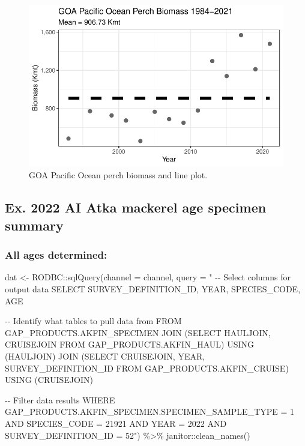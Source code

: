 \documentclass[
  letterpaper,
  oneside,
  open=any]{scrbook}
\newenvironment{Shaded}{\begin{snugshade}}{\end{snugshade}}
\newcommand{\AttributeTok}[1]{\textcolor[rgb]{0.40,0.45,0.13}{#1}}
\newcommand{\FunctionTok}[1]{\textcolor[rgb]{0.28,0.35,0.67}{#1}}
\newcommand{\NormalTok}[1]{\textcolor[rgb]{0.00,0.23,0.31}{#1}}
\newcommand{\OtherTok}[1]{\textcolor[rgb]{0.00,0.23,0.31}{#1}}
\newcommand{\SpecialCharTok}[1]{\textcolor[rgb]{0.37,0.37,0.37}{#1}}
\newcommand{\StringTok}[1]{\textcolor[rgb]{0.13,0.47,0.30}{#1}}
\begin{document}
\begin{figure}[H]

{\centering \includegraphics{content/akfin-oracle-sql-r_files/figure-pdf/test-5-fig-1.pdf}

}

\caption{GOA Pacific Ocean perch biomass and line plot.}

\end{figure}

\hypertarget{ex.-2022-ai-atka-mackerel-age-specimen-summary}{%
\subsection{Ex. 2022 AI Atka mackerel age specimen
summary}\label{ex.-2022-ai-atka-mackerel-age-specimen-summary}}

\hypertarget{all-ages-determined}{%
\subsubsection{All ages determined:}\label{all-ages-determined}}

\begin{Shaded}
\begin{Highlighting}[]
\NormalTok{dat }\OtherTok{\textless{}{-}}\NormalTok{ RODBC}\SpecialCharTok{::}\FunctionTok{sqlQuery}\NormalTok{(}\AttributeTok{channel =}\NormalTok{ channel,}
                       \AttributeTok{query =} \StringTok{"}
\StringTok{{-}{-} Select columns for output data}
\StringTok{SELECT SURVEY\_DEFINITION\_ID, YEAR, SPECIES\_CODE, AGE}

\StringTok{{-}{-} Identify what tables to pull data from}
\StringTok{FROM GAP\_PRODUCTS.AKFIN\_SPECIMEN}
\StringTok{JOIN (SELECT HAULJOIN, CRUISEJOIN FROM GAP\_PRODUCTS.AKFIN\_HAUL)}
\StringTok{USING (HAULJOIN)}
\StringTok{JOIN (SELECT CRUISEJOIN, YEAR, SURVEY\_DEFINITION\_ID FROM GAP\_PRODUCTS.AKFIN\_CRUISE)}
\StringTok{USING (CRUISEJOIN)}

\StringTok{{-}{-} Filter data results}
\StringTok{WHERE GAP\_PRODUCTS.AKFIN\_SPECIMEN.SPECIMEN\_SAMPLE\_TYPE = 1}
\StringTok{AND SPECIES\_CODE = 21921}
\StringTok{AND YEAR = 2022}
\StringTok{AND SURVEY\_DEFINITION\_ID = 52"}\NormalTok{) }\SpecialCharTok{\%\textgreater{}\%} 
\NormalTok{  janitor}\SpecialCharTok{::}\FunctionTok{clean\_names}\NormalTok{()}
\end{Highlighting}
\end{Shaded}
\end{document}
